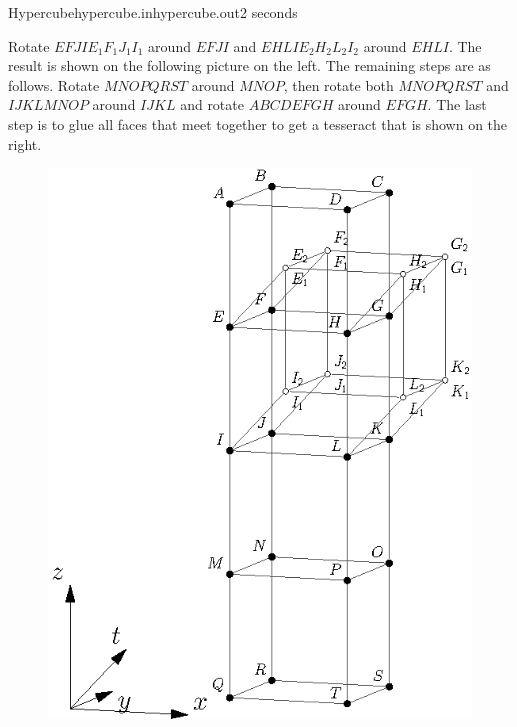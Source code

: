 \begin{problem}{Hypercube}{hypercube.in}{hypercube.out}{2 seconds}
\begin{figure}[h!]
\begin{minipage}[b]{0.5\textwidth}
\end{minipage}%
\end{figure}

Rotate $EFJIE_1F_1J_1I_1$ around $EFJI$ and $EHLIE_2H_2L_2I_2$ around $EHLI$. The result is shown
on the following picture on the left. The remaining steps are as follows.
Rotate $MNOPQRST$ around $MNOP$, then
rotate both $MNOPQRST$ and $IJKLMNOP$ around $IJKL$ and rotate $ABCDEFGH$ around $EFGH$. The last step is to 
glue all faces that meet together to get a tesseract that is shown on the right. 

\begin{figure}[h!]
\begin{minipage}[b]{0.5\textwidth}
\centering\includegraphics{pics/hypercube3.eps}
\end{minipage}%
\begin{minipage}[b]{0.5\textwidth}

\end{minipage}
\end{figure}
\end{problem}
